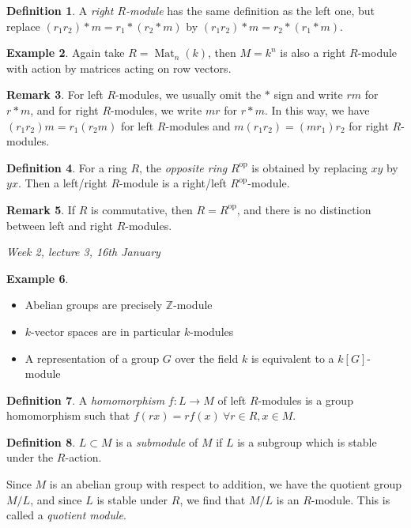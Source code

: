 \documentclass{article}
\newcommand{\Z}{\mathbb{Z}}
\newcommand{\op}{{\operatorname{op}}}
\newcommand{\Mat}{\operatorname{Mat}}
\theoremstyle{definition}
\newtheorem{defn}{Definition}[subsection]
\newtheorem{example}[defn]{Example}
\newtheorem{remark}[defn]{Remark}
\begin{document}
\begin{defn}
A \textit{right $R$-module} has the same definition as the left one, but replace $(r_1r_2)\ast m=r_1\ast (r_2\ast m)$ by $(r_1r_2)\ast m=r_2\ast (r_1\ast m)$.
\end{defn}

\begin{example}
Again take $R=\Mat_n(k)$, then $M=k^n$ is also a right $R$-module with action by matrices acting on row vectors.
\end{example}

\begin{remark}
For left $R$-modules, we usually omit the $\ast$ sign and write $rm$ for $r\ast m$, and for right $R$-modules, we write $mr$ for $r\ast m$. In this way, we have $(r_1r_2)m=r_1(r_2m)$ for left $R$-modules and $m(r_1r_2)=(mr_1)r_2$ for right $R$-modules.
\end{remark}

\begin{defn}
For a ring $R$, the \textit{opposite ring} $R^\op$ is obtained by replacing $xy$ by $yx$. Then a left/right $R$-module is a right/left $R^\op$-module.
\end{defn}

\begin{remark}
If $R$ is commutative, then $R=R^\op$, and there is no distinction between left and right $R$-modules.
\end{remark}

\begin{flushright}
\textit{Week 2, lecture 3, 16th January}
\end{flushright}

\begin{example}
\begin{itemize}
\item Abelian groups are precisely $\Z$-module
\item $k$-vector spaces are in particular $k$-modules
\item A representation of a group $G$ over the field $k$ is equivalent to a $k[G]$-module
\end{itemize}
\end{example}

\begin{defn}
A \textit{homomorphism} $f:L\rightarrow M$ of left $R$-modules is a group homomorphism such that $f(rx)=rf(x) \ \forall r\in R,x\in M$.
\end{defn}

\begin{defn}
$L\subset M$ is a \textit{submodule} of $M$ if $L$ is a subgroup which is stable under the $R$-action.

Since $M$ is an abelian group with respect to addition, we have the quotient group $M/L$, and since $L$ is stable under $R$, we find that $M/L$ is an $R$-module. This is called a \textit{quotient module}.
\end{defn}
\end{document}
